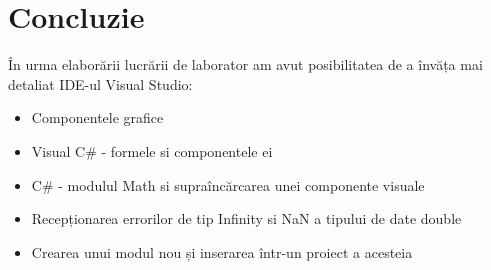 \section*{Concluzie}

În urma elaborării lucrării de laborator am avut posibilitatea de a învăța mai detaliat IDE-ul Visual Studio:
\begin{itemize}
	\item Componentele grafice
	\item Visual C\# - formele si componentele ei
	\item C\# - modulul Math si supraîncărcarea unei componente visuale
	\item Recepționarea errorilor de tip Infinity si NaN a tipului de date double \cite{bugs}
	\item Crearea unui modul nou și inserarea într-un proiect a acesteia
\end{itemize}



\clearpage